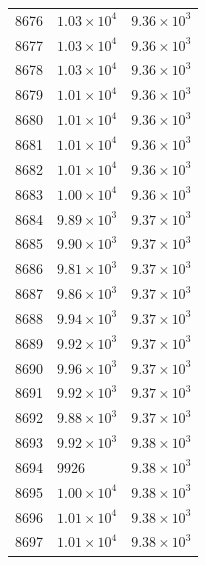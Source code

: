 \begin{table}[H]
\begin{tabular}{lll}
8676 & $\displaystyle 1.03 \times 10^{4}$ & $\displaystyle 9.36 \times 10^{3}$ \\
8677 & $\displaystyle 1.03 \times 10^{4}$ & $\displaystyle 9.36 \times 10^{3}$ \\
8678 & $\displaystyle 1.03 \times 10^{4}$ & $\displaystyle 9.36 \times 10^{3}$ \\
8679 & $\displaystyle 1.01 \times 10^{4}$ & $\displaystyle 9.36 \times 10^{3}$ \\
8680 & $\displaystyle 1.01 \times 10^{4}$ & $\displaystyle 9.36 \times 10^{3}$ \\
8681 & $\displaystyle 1.01 \times 10^{4}$ & $\displaystyle 9.36 \times 10^{3}$ \\
8682 & $\displaystyle 1.01 \times 10^{4}$ & $\displaystyle 9.36 \times 10^{3}$ \\
8683 & $\displaystyle 1.00 \times 10^{4}$ & $\displaystyle 9.36 \times 10^{3}$ \\
8684 & $\displaystyle 9.89 \times 10^{3}$ & $\displaystyle 9.37 \times 10^{3}$ \\
8685 & $\displaystyle 9.90 \times 10^{3}$ & $\displaystyle 9.37 \times 10^{3}$ \\
8686 & $\displaystyle 9.81 \times 10^{3}$ & $\displaystyle 9.37 \times 10^{3}$ \\
8687 & $\displaystyle 9.86 \times 10^{3}$ & $\displaystyle 9.37 \times 10^{3}$ \\
8688 & $\displaystyle 9.94 \times 10^{3}$ & $\displaystyle 9.37 \times 10^{3}$ \\
8689 & $\displaystyle 9.92 \times 10^{3}$ & $\displaystyle 9.37 \times 10^{3}$ \\
8690 & $\displaystyle 9.96 \times 10^{3}$ & $\displaystyle 9.37 \times 10^{3}$ \\
8691 & $\displaystyle 9.92 \times 10^{3}$ & $\displaystyle 9.37 \times 10^{3}$ \\
8692 & $\displaystyle 9.88 \times 10^{3}$ & $\displaystyle 9.37 \times 10^{3}$ \\
8693 & $\displaystyle 9.92 \times 10^{3}$ & $\displaystyle 9.38 \times 10^{3}$ \\
8694 & 9926 & $\displaystyle 9.38 \times 10^{3}$ \\
8695 & $\displaystyle 1.00 \times 10^{4}$ & $\displaystyle 9.38 \times 10^{3}$ \\
8696 & $\displaystyle 1.01 \times 10^{4}$ & $\displaystyle 9.38 \times 10^{3}$ \\
8697 & $\displaystyle 1.01 \times 10^{4}$ & $\displaystyle 9.38 \times 10^{3}$ \\

\end{tabular}
\end{table}
